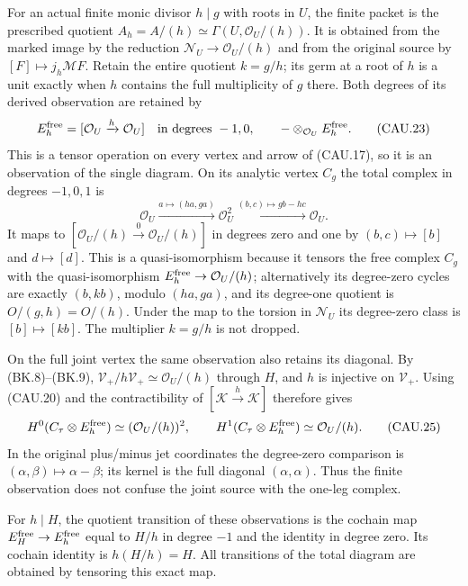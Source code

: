 For an actual finite monic divisor $h\mid g$ with roots in $U$, the
finite packet is the prescribed quotient
$A_h=A/(h)\simeq\Gamma(U,\mathcal O_U/(h))$.
It is obtained from the marked image by the reduction
$\mathcal N_U\to\mathcal O_U/(h)$ and from the original source by
$[F]\mapsto j_h\mathcal MF$.  Retain the entire quotient $k=g/h$;
its germ at a root of $h$ is a unit exactly when $h$ contains the
full multiplicity of $g$ there.
Both degrees of its derived observation are retained by
\[
 E_h^{\rm free}=[\mathcal O_U\xrightarrow{h}\mathcal O_U]
 \quad\text{in degrees }-1,0,
 \qquad -\otimes_{\mathcal O_U}E_h^{\rm free}.                \tag{CAU.23}
\]
This is a tensor operation on every vertex and arrow of (CAU.17),
so it is an observation of the single diagram.  On its analytic vertex
$C_g$ the total complex in degrees $-1,0,1$ is
\[
 \mathcal O_U\xrightarrow{a\mapsto(ha,ga)}\mathcal O_U^2
             \xrightarrow{(b,c)\mapsto gb-hc}\mathcal O_U.
                                                               \tag{CAU.24}
\]
It maps to $[\mathcal O_U/(h)\xrightarrow0\mathcal O_U/(h)]$
in degrees zero and one by $(b,c)\mapsto[b]$ and $d\mapsto[d]$.
This is a quasi-isomorphism because it tensors the free complex $C_g$
with the quasi-isomorphism $E_h^{\rm free}\to\mathcal O_U/(h)$;
alternatively its degree-zero cycles are exactly $(b,kb)$, modulo
$(ha,ga)$, and its degree-one quotient is $O/(g,h)=O/(h)$.
Under the map to the torsion in $\mathcal N_U$ its degree-zero class is
$[b]\mapsto[kb]$.  The multiplier $k=g/h$ is not dropped.

On the full joint vertex the same observation also retains its diagonal.
By (BK.8)--(BK.9), $\mathcal V_+/h\mathcal V_+\simeq\mathcal O_U/(h)$
through $H$, and $h$ is injective on $\mathcal V_+$.
Using (CAU.20) and the contractibility of
$[\mathcal K\xrightarrow{h}\mathcal K]$ therefore gives
\[
 H^0(C_\tau\otimes E_h^{\rm free})
       \simeq (\mathcal O_U/(h))^2,\qquad
 H^1(C_\tau\otimes E_h^{\rm free})\simeq\mathcal O_U/(h).
                                                               \tag{CAU.25}
\]
In the original plus/minus jet coordinates the degree-zero comparison
is $(\alpha,\beta)\mapsto\alpha-\beta$; its kernel is the full
diagonal $(\alpha,\alpha)$.  Thus the finite observation does not
confuse the joint source with the one-leg complex.

For $h\mid H$, the quotient transition of these observations is the
cochain map $E_H^{\rm free}\to E_h^{\rm free}$ equal to $H/h$ in
degree $-1$ and the identity in degree zero.  Its cochain identity is
$h(H/h)=H$.  All transitions of the total diagram are obtained by
tensoring this exact map.

